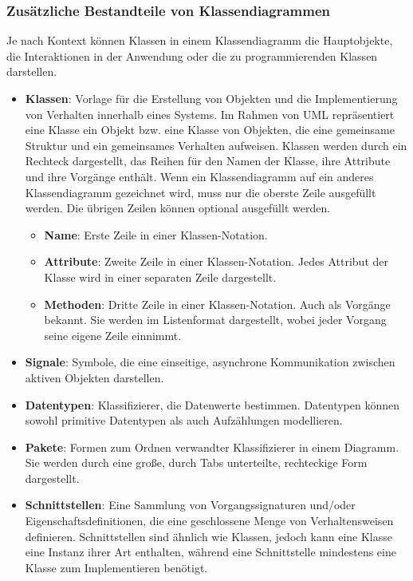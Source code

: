 \subsubsection{Zusätzliche Bestandteile von Klassendiagrammen}
Je nach Kontext können Klassen in einem Klassendiagramm die Hauptobjekte, die Interaktionen in der Anwendung oder die zu programmierenden Klassen darstellen.

\begin{itemize}
	\item \textbf{Klassen}: Vorlage für die Erstellung von Objekten und die Implementierung von Verhalten innerhalb eines Systems. Im Rahmen von UML repräsentiert eine Klasse ein Objekt bzw. eine Klasse von Objekten, die eine gemeinsame Struktur und ein gemeinsames Verhalten aufweisen. Klassen werden durch ein Rechteck dargestellt, das Reihen für den Namen der Klasse, ihre Attribute und ihre Vorgänge enthält. Wenn ein Klassendiagramm auf ein anderes Klassendiagramm gezeichnet wird, muss nur die oberste Zeile ausgefüllt werden. Die übrigen Zeilen können optional ausgefüllt werden.
	\begin{itemize}
		\item \textbf{Name}: Erste Zeile in einer Klassen-Notation.
		\item \textbf{Attribute}: Zweite Zeile in einer Klassen-Notation. Jedes Attribut der Klasse wird in einer separaten Zeile dargestellt.
		\item \textbf{Methoden}: Dritte Zeile in einer Klassen-Notation. Auch als Vorgänge bekannt. Sie werden im Listenformat dargestellt, wobei jeder Vorgang seine eigene Zeile einnimmt.
	\end{itemize}
	\item \textbf{Signale}: Symbole, die eine einseitige, asynchrone Kommunikation zwischen aktiven Objekten darstellen.
	
	\item \textbf{Datentypen}: Klassifizierer, die Datenwerte bestimmen. Datentypen können sowohl primitive Datentypen als auch Aufzählungen modellieren.
	
	\item \textbf{Pakete}: Formen zum Ordnen verwandter Klassifizierer in einem Diagramm. Sie werden durch eine große, durch Tabs unterteilte, rechteckige Form dargestellt.
	
	\item \textbf{Schnittstellen}: Eine Sammlung von Vorgangssignaturen und/oder Eigenschaftsdefinitionen, die eine geschlossene Menge von Verhaltensweisen definieren. Schnittstellen sind ähnlich wie Klassen, jedoch kann eine Klasse eine Instanz ihrer Art enthalten, während eine Schnittstelle mindestens eine Klasse zum Implementieren benötigt.
	

\end{itemize}
